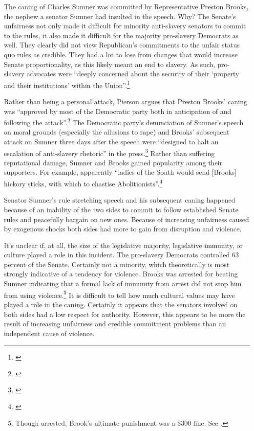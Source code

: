 \documentclass[a4paper]{article}\usepackage[]{graphicx}\usepackage[]{color}
\begin{document}
The caning of Charles Sumner was committed by Representative Preston Brooks, the nephew a senator Sumner had insulted in the speech. Why? The Senate's unfairness not only made it difficult for minority anti-slavery senators to commit to the rules, it also made it difficult for the majority pro-slavery Democrats as well. They clearly did not view Republican's commitments to the unfair status quo rules as credible. They had a lot to lose from changes that would increase Senate proportionality, as this likely meant an end to slavery. As such, pro-slavery advocates were ``deeply concerned about the security of their `property and their institutions' within the Union''.\footnote{\citealt[281]{Mittal2013}} 

Rather than being a personal attack, Pierson argues that Preston Brooks' caning was ``approved by most of the Democratic party both in anticipation of and following the attack''.\footnote{\citealt[553]{Pierson1995}} The Democratic party's denunciation of Sumner's speech on moral grounds (especially the allusions to rape) and Brooks' subsequent attack on Sumner three days after the speech were ``designed to halt an escalation of anti-slavery rhetoric'' in the press.\footnote{\citealt[553]{Pierson1995}} Rather than suffering reputational damage, Sumner and Brooks gained popularity among their supporters. For example, apparently ``ladies of the South would send [Brooks] hickory sticks, with which to chastise Abolitionists''.\footnote{\citealt[255]{Donald2009}}

Senator Sumner's rule stretching speech and his subsequent caning happened because of an inability of the two sides to commit to follow established Senate rules and peacefully bargain on new ones. Because of increasing unfairness caused by exogenous shocks both sides had more to gain from disruption and violence. 

It's unclear if, at all, the size of the legislative majority, legislative immunity, or culture played a role in this incident. The pro-slavery Democrats controlled 63 percent of the Senate. Certainly not a minority, which theoretically is most strongly indicative of a tendency for violence. Brooks was arrested for beating Sumner indicating that a formal lack of immunity from arrest did not stop him from using violence.\footnote{Though arrested, Brook's ultimate punishment was a \$300 fine. See \citealt[59]{Wolfe2004}.} It is difficult to tell how much cultural values may have played a role in the caning. Certainly it appears that the senators involved on both sides had a low respect for authority. However, this appears to be more the result of increasing unfairness and credible commitment problems than an independent cause of violence. 
\end{document}
